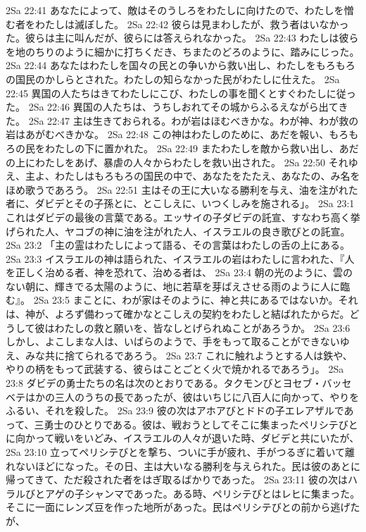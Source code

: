 2Sa 22:41  あなたによって、敵はそのうしろをわたしに向けたので、わたしを憎む者をわたしは滅ぼした。
2Sa 22:42  彼らは見まわしたが、救う者はいなかった。彼らは主に叫んだが、彼らには答えられなかった。
2Sa 22:43  わたしは彼らを地のちりのように細かに打ちくだき、ちまたのどろのように、踏みにじった。
2Sa 22:44  あなたはわたしを国々の民との争いから救い出し、わたしをもろもろの国民のかしらとされた。わたしの知らなかった民がわたしに仕えた。
2Sa 22:45  異国の人たちはきてわたしにこび、わたしの事を聞くとすぐわたしに従った。
2Sa 22:46  異国の人たちは、うちしおれてその城からふるえながら出てきた。
2Sa 22:47  主は生きておられる。わが岩はほむべきかな。わが神、わが救の岩はあがむべきかな。
2Sa 22:48  この神はわたしのために、あだを報い、もろもろの民をわたしの下に置かれた。
2Sa 22:49  またわたしを敵から救い出し、あだの上にわたしをあげ、暴虐の人々からわたしを救い出された。
2Sa 22:50  それゆえ、主よ、わたしはもろもろの国民の中で、あなたをたたえ、あなたの、み名をほめ歌うであろう。
2Sa 22:51  主はその王に大いなる勝利を与え、油を注がれた者に、ダビデとその子孫とに、とこしえに、いつくしみを施される」。
2Sa 23:1  これはダビデの最後の言葉である。エッサイの子ダビデの託宣、すなわち高く挙げられた人、ヤコブの神に油を注がれた人、イスラエルの良き歌びとの託宣。
2Sa 23:2  「主の霊はわたしによって語る、その言葉はわたしの舌の上にある。
2Sa 23:3  イスラエルの神は語られた、イスラエルの岩はわたしに言われた、『人を正しく治める者、神を恐れて、治める者は、
2Sa 23:4  朝の光のように、雲のない朝に、輝きでる太陽のように、地に若草を芽ばえさせる雨のように人に臨む』。
2Sa 23:5  まことに、わが家はそのように、神と共にあるではないか。それは、神が、よろず備わって確かなとこしえの契約をわたしと結ばれたからだ。どうして彼はわたしの救と願いを、皆なしとげられぬことがあろうか。
2Sa 23:6  しかし、よこしまな人は、いばらのようで、手をもって取ることができないゆえ、みな共に捨てられるであろう。
2Sa 23:7  これに触れようとする人は鉄や、やりの柄をもって武装する、彼らはことごとく火で焼かれるであろう」。
2Sa 23:8  ダビデの勇士たちの名は次のとおりである。タクモンびとヨセブ・バッセベテはかの三人のうちの長であったが、彼はいちじに八百人に向かって、やりをふるい、それを殺した。
2Sa 23:9  彼の次はアホアびとドドの子エレアザルであって、三勇士のひとりである。彼は、戦おうとしてそこに集まったペリシテびとに向かって戦いをいどみ、イスラエルの人々が退いた時、ダビデと共にいたが、
2Sa 23:10  立ってペリシテびとを撃ち、ついに手が疲れ、手がつるぎに着いて離れないほどになった。その日、主は大いなる勝利を与えられた。民は彼のあとに帰ってきて、ただ殺された者をはぎ取るばかりであった。
2Sa 23:11  彼の次はハラルびとアゲの子シャンマであった。ある時、ペリシテびとはレヒに集まった。そこに一面にレンズ豆を作った地所があった。民はペリシテびとの前から逃げたが、
